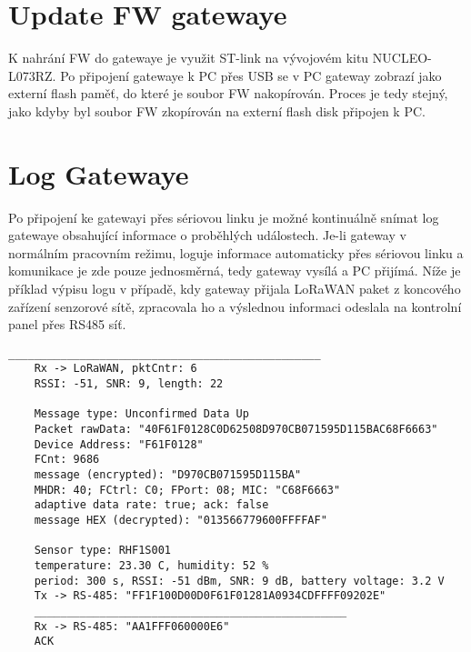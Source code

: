



\section{Update FW gatewaye}
K nahrání FW do gatewaye je využit ST-link na vývojovém kitu NUCLEO-L073RZ. 
Po připojení gatewaye k PC přes USB se v PC gateway zobrazí jako externí flash paměť, do které je soubor FW nakopírován. Proces je tedy stejný, jako kdyby byl soubor FW zkopírován na externí flash disk připojen k PC.



\newpage
\section{Log Gatewaye}
Po připojení ke gatewayi přes sériovou linku %
je možné kontinuálně snímat log gatewaye obsahující informace o proběhlých událostech. Je-li gateway v normálním pracovním režimu, loguje informace automaticky přes sériovou linku a komunikace je zde pouze jednosměrná, tedy gateway vysílá a PC přijímá.
Níže je příklad výpisu logu v případě, kdy gateway přijala LoRaWAN paket z koncového zařízení senzorové sítě, zpracovala ho a výslednou informaci odeslala na kontrolní panel přes RS485 síť.

\begin{lstlisting}[style=log]
    ________________________________________________
    Rx -> LoRaWAN, pktCntr: 6
    RSSI: -51, SNR: 9, length: 22

    Message type: Unconfirmed Data Up
    Packet rawData: "40F61F0128C0D62508D970CB071595D115BAC68F6663"
    Device Address: "F61F0128"
    FCnt: 9686
    message (encrypted): "D970CB071595D115BA"
    MHDR: 40; FCtrl: C0; FPort: 08; MIC: "C68F6663"
    adaptive data rate: true; ack: false
    message HEX (decrypted): "013566779600FFFFAF"

    Sensor type: RHF1S001
    temperature: 23.30 C, humidity: 52 %
    period: 300 s, RSSI: -51 dBm, SNR: 9 dB, battery voltage: 3.2 V
    Tx -> RS-485: "FF1F100D00D0F61F01281A0934CDFFFF09202E"
    ________________________________________________
    Rx -> RS-485: "AA1FFF060000E6"
    ACK
\end{lstlisting}

